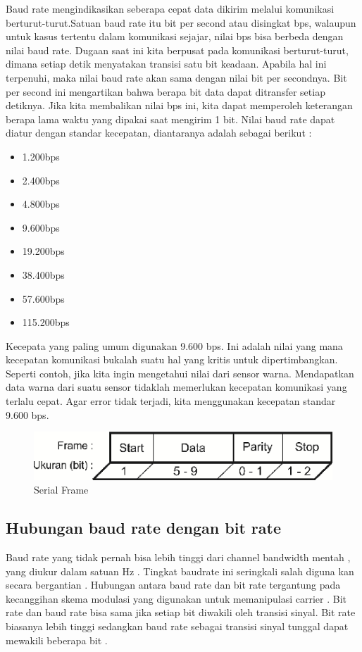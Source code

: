 Baud rate mengindikasikan seberapa cepat data dikirim melalui komunikasi berturut-turut.Satuan baud rate itu bit per second atau disingkat bps, walaupun untuk kasus tertentu dalam komunikasi sejajar, nilai bps bisa berbeda dengan nilai baud rate. Dugaan saat ini kita berpusat pada komunikasi berturut-turut, dimana setiap detik menyatakan transisi satu bit keadaan. Apabila hal ini terpenuhi, maka nilai baud rate akan sama dengan nilai bit per secondnya. Bit per second ini mengartikan bahwa berapa bit data dapat ditransfer setiap detiknya. Jika kita membalikan nilai bps ini, kita dapat memperoleh keterangan berapa lama waktu yang dipakai saat mengirim 1 bit. Nilai baud rate dapat diatur dengan standar kecepatan, diantaranya adalah sebagai berikut :
\begin {itemize}
	\item 1.200bps
	\item 2.400bps 
	\item 4.800bps 
	\item 9.600bps 
	\item 19.200bps	
	\item 38.400bps 
	\item 57.600bps
	\item 115.200bps
\end {itemize}	
	Kecepata yang paling umum digunakan 9.600 bps. Ini adalah nilai yang mana kecepatan komunikasi bukalah suatu hal yang kritis untuk dipertimbangkan. Seperti contoh, jika kita ingin mengetahui nilai dari sensor warna. Mendapatkan data warna dari suatu sensor tidaklah memerlukan kecepatan komunikasi yang terlalu cepat. Agar  error tidak terjadi, kita menggunakan kecepatan standar 9.600 bps.

\begin{figure}[ht]
	\centerline{\includegraphics[width=1\textwidth]{figures/serialframe.png}}
	\caption{Serial Frame}
	\label{serialframe}
\end{figure}
\subsection{ Hubungan baud rate dengan bit rate}
Baud rate yang tidak pernah bisa lebih tinggi dari channel bandwidth mentah , yang diukur dalam satuan Hz . Tingkat baudrate ini seringkali salah diguna kan secara bergantian . Hubungan antara baud rate dan bit rate tergantung pada kecanggihan skema modulasi yang digunakan untuk memanipulasi carrier . Bit rate dan baud rate bisa sama jika setiap bit diwakili oleh transisi sinyal. Bit rate biasanya lebih tinggi sedangkan baud rate sebagai transisi sinyal tunggal dapat mewakili beberapa bit .
